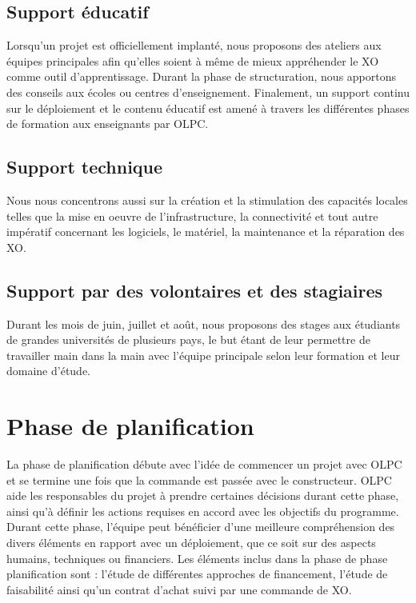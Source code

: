 \documentclass[11pt]{article}
\begin{document}
\subsection{Support éducatif}
\label{sec-5-2}



Lorsqu'un projet est officiellement implanté, nous proposons des ateliers
aux équipes principales afin qu'elles soient à même de mieux appréhender le
XO comme outil d'apprentissage. Durant la phase de structuration, nous
apportons des conseils aux écoles ou centres d'enseignement. Finalement, un
support continu sur le déploiement et le contenu éducatif est amené à
travers les différentes phases de formation aux enseignants par OLPC.
\subsection{Support technique}
\label{sec-5-3}



Nous nous concentrons aussi sur la création et la stimulation des capacités
locales telles que la mise en oeuvre de l'infrastructure, la connectivité et
tout autre impératif concernant les logiciels, le matériel, la maintenance
et la réparation des XO.
\subsection{Support par des volontaires et des stagiaires}
\label{sec-5-4}



Durant les mois de juin, juillet et août, nous proposons des stages aux
étudiants de grandes universités de plusieurs pays, le but étant de leur
permettre de travailler main dans la main avec l'équipe principale selon
leur formation et leur domaine d'étude.
\section{Phase de planification}
\label{sec-6}


La phase de planification débute avec l'idée de commencer un projet avec
OLPC et se termine une fois que la commande est passée avec le
constructeur. OLPC aide les responsables du projet à prendre certaines
décisions durant cette phase, ainsi qu'à définir les actions requises en
accord avec les objectifs du programme. Durant cette phase, l'équipe peut
bénéficier d'une meilleure compréhension des divers éléments en rapport
avec un déploiement, que ce soit sur des aspects humains, techniques ou
financiers. Les éléments inclus dans la phase de phase planification sont :
l'étude de différentes approches de financement, l'étude de faisabilité
ainsi qu'un contrat d'achat suivi par une commande de XO.
\end{document}
